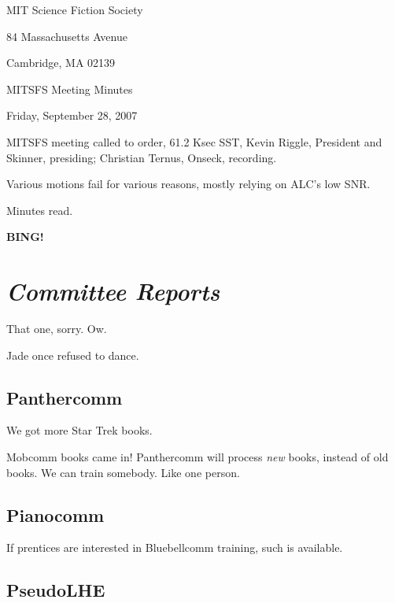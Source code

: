 \documentclass[10pt]{article}
\newcommand{\bing}{{\bf BING!} }
\newcommand{\goto}[1]{\bing \vskip 12pt \section*{{\em{#1}}}}
\begin{document}
\begin{center}

MIT Science Fiction Society

84 Massachusetts Avenue

Cambridge, MA 02139

\vspace{12pt}

MITSFS Meeting Minutes

Friday, September 28, 2007

\end{center}

\vspace{18pt}

\setlength{\parskip}{6pt}

\noindent
MITSFS meeting called to order, 61.2 Ksec SST,
Kevin Riggle, President and Skinner, presiding; Christian Ternus, Onseck, recording.

Various motions fail for various reasons, mostly relying on ALC's low SNR.

Minutes read.

\BING

\goto{Committee Reports}

That one, sorry.  Ow.

Jade once refused to dance.

\subsection*{Panthercomm}

We got more Star Trek books.

Mobcomm books came in!  Panthercomm will process \emph{new} books, instead of old books.  We can train somebody.  Like one person.

\subsection*{Pianocomm}

If prentices are interested in Bluebellcomm training, such is available.


\subsection*{PseudoLHE}
\end{document}

